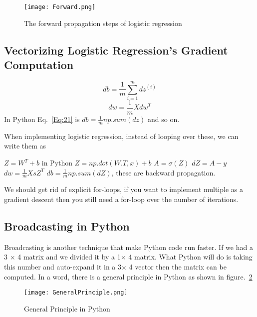\documentclass[a4paper]{article}
\begin{document}
\begin{figure}[!htp]
\begin{center}
   \texttt{[image: Forward.png]}
\end{center}
   \caption{The forward propagation steps of logistic regression}
\label{fig:Forward}
\end{figure}

\subsection{Vectorizing Logistic Regression's Gradient Computation}
\begin{equation}
db=\frac{1}{m}\sum^m_{i=1}dz^{(i)}
\label{Eq:21}
\end{equation}
\begin{equation}
dw=\frac{1}{m}Xdw^T
\label{Eq:22}
\end{equation}
In Python Eq.~\ref{Eq:21} is $db=\frac{1}{m} np.sum(dz)$ and so on.\par
When implementing logistic regression, instead of looping over these, we can write them as \par
$Z=W^T+b$ in Python $Z=np.dot(W.T,x)+b$ \quad $A=\sigma(Z)$ \quad $dZ=A-y$ \quad $dw=\frac{1}{m}XsZ^T$ \quad $db=\frac{1}{m}np.sum(dZ)$, these are backward propagation.\par
We should get rid of explicit for-loops, if you want to implement multiple as a gradient descent then you still need a for-loop over the number of iterations.


\subsection{Broadcasting in Python}
Broadcasting is another technique that make Python code run faster. If we had a 3 $\times$ 4 matrix and we divided it by a 1$\times$ 4 matrix. What Python will do is taking this number and auto-expand it in a 3$\times$ 4 vector then the matrix can be computed. In a word, there is a general principle in Python as shown in figure.~\ref{fig:Principle}

\begin{figure}[!htp]
\begin{center}
   \texttt{[image: GeneralPrinciple.png]}
\end{center}
   \caption{General Principle in Python}
\label{fig:Principle}
\end{figure}
\end{document}
